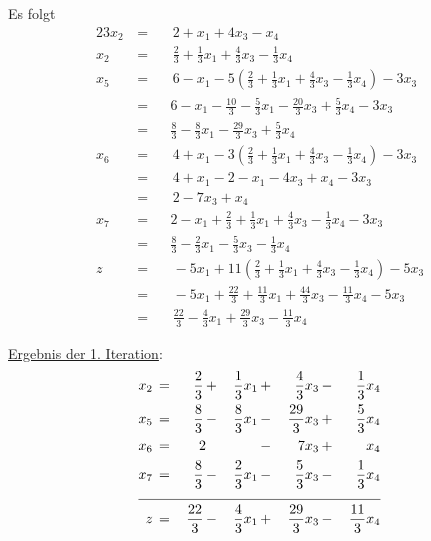 \documentclass[10pt,a4paper,oneside,ngerman,numbers=noenddot]{scrartcl}
\begin{document}
		Es folgt
		\begin{alignat*}{2}
			3x_{2} \,&=&&\, 2 + x_{1} + 4x_{3} - x_{4} \\
			x_{2} \,&=&&\, \frac{2}{3} + \frac{1}{3}x_{1} + \frac{4}{3}x_{3} - \frac{1}{3}x_{4} \\
			x_{5} \,&=&&\, 6 - x_{1} - 5\left(\frac{2}{3} + \frac{1}{3}x_{1} + \frac{4}{3}x_{3} - \frac{1}{3}x_{4}\right) - 3x_{3} \\
			&=&& 6 - x_{1} - \frac{10}{3} - \frac{5}{3}x_{1} - \frac{20}{3}x_{3} + \frac{5}{3}x_{4} - 3x_{3} \\
			&=&& \frac{8}{3} - \frac{8}{3}x_{1} - \frac{29}{3}x_{3} + \frac{5}{3}x_{4} \\
			x_{6} \,&=&&\, 4 + x_{1} - 3\left(\frac{2}{3} + \frac{1}{3}x_{1} + \frac{4}{3}x_{3} - \frac{1}{3}x_{4}\right) - 3x_{3} \\
			&=&&\, 4 + x_{1} - 2 - x_{1} - 4x_{3} + x_{4} - 3x_{3} \\
			&=&&\, 2 - 7x_{3} + x_{4} \\
			x_{7} &=&& 2 - x_{1} + \frac{2}{3} + \frac{1}{3}x_{1} + \frac{4}{3}x_{3} - \frac{1}{3}x_{4} - 3x_{3} \\
			&=&& \frac{8}{3} - \frac{2}{3}x_{1} - \frac{5}{3}x_{3} - \frac{1}{3}x_{4} \\
			z \,&=&&\, - 5x_{1} + 11\left(\frac{2}{3} + \frac{1}{3}x_{1} + \frac{4}{3}x_{3} - \frac{1}{3}x_{4}\right) - 5x_{3} \\
			&=&&\, -5x_{1} + \frac{22}{3} + \frac{11}{3}x_{1} + \frac{44}{3}x_{3} - \frac{11}{3}x_{4} - 5x_{3} \\
			&=&&\, \frac{22}{3} - \frac{4}{3}x_{1} + \frac{29}{3}x_{3} - \frac{11}{3}x_{4}
		\end{alignat*}
		
		\underline{Ergebnis der 1. Iteration}:
		\begin{alignat*}{5}
			x_{2} \,&=&\, \frac{2}{3} \,&+&\, \frac{1}{3}x_{1} \,&+&\, \frac{4}{3}x_{3} \,&-&\, \frac{1}{3}x_{4} \\
			x_{5} \,&=&\, \frac{8}{3} \,&-&\, \frac{8}{3}x_{1} \,&-&\, \frac{29}{3}x_{3} \,&+&\, \frac{5}{3}x_{4} \\
			x_{6} \,&=&\, 2 && \,&-&\, 7x_{3} \,&+&\, x_{4} \\
			x_{7} \,&=&\, \frac{8}{3} \,&-&\, \frac{2}{3}x_{1} \,&-&\, \frac{5}{3}x_{3} \,&-&\, \frac{1}{3}x_{4} \\ \cline{1 - 9}
			z \,&=&\, \frac{22}{3} \,&-&\, \frac{4}{3}x_{1} \,&+&\, \frac{29}{3}x_{3} \,&-&\, \frac{11}{3}x_{4}
		\end{alignat*}
		
\end{document}
